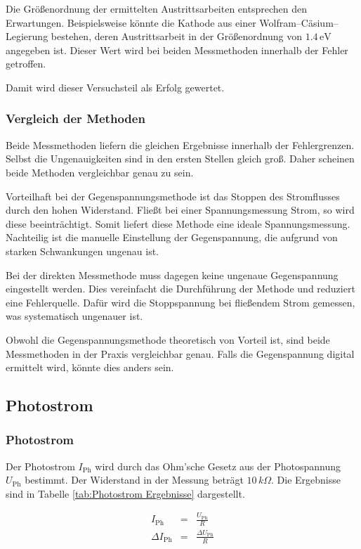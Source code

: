 \documentclass[12pt,a4paper]{scrartcl}
\numberwithin{equation}{section} %
\begin{document}
Die Größenordnung der ermittelten Austrittsarbeiten entsprechen den Erwartungen. Beispielsweise könnte die Kathode aus einer Wolfram--Cäsium--Legierung bestehen, deren Austrittsarbeit in der Größenordnung von $1.4\mathrm{\,eV}$ \cite{Demtröder} angegeben ist. Dieser Wert wird bei beiden Messmethoden innerhalb der Fehler getroffen.

Damit wird dieser Versuchsteil als Erfolg gewertet.

\subsubsection{Vergleich der Methoden}
Beide Messmethoden liefern die gleichen Ergebnisse innerhalb der Fehlergrenzen. Selbst die Ungenauigkeiten sind in den ersten Stellen gleich groß. Daher scheinen beide Methoden vergleichbar genau zu sein.

Vorteilhaft bei der Gegenspannungsmethode ist das Stoppen des Stromflusses durch den hohen Widerstand. Fließt bei einer Spannungsmessung Strom, so wird diese beeinträchtigt. Somit liefert diese Methode eine ideale Spannungsmessung. Nachteilig ist die manuelle Einstellung der Gegenspannung, die aufgrund von starken Schwankungen ungenau ist.

Bei der direkten Messmethode muss dagegen keine ungenaue Gegenspannung eingestellt werden. Dies vereinfacht die Durchführung der Methode und reduziert eine Fehlerquelle. Dafür wird die Stoppspannung bei fließendem Strom gemessen, was systematisch ungenauer ist.

Obwohl die Gegenspannungsmethode theoretisch von Vorteil ist, sind beide Messmethoden in der Praxis vergleichbar genau. Falls die Gegenspannung digital ermittelt wird, könnte dies anders sein.

\subsection{Photostrom}
\subsubsection{Photostrom}

Der Photostrom $I_\mathrm{Ph}$ wird durch das Ohm'sche Gesetz aus der Photospannung $U_\mathrm{Ph}$ bestimmt. Der Widerstand in der Messung beträgt $10 \,k\Omega$. Die Ergebnisse sind in Tabelle \ref{tab:Photostrom Ergebnisse} dargestellt.

\begin{eqnarray}
	I_\mathrm{Ph} &=& \frac{U_\mathrm{Ph}}{R} \\
	\Delta I_\mathrm{Ph} &=& \frac{\Delta U_\mathrm{Ph}}{R}\\
\end{eqnarray}
\end{document}
